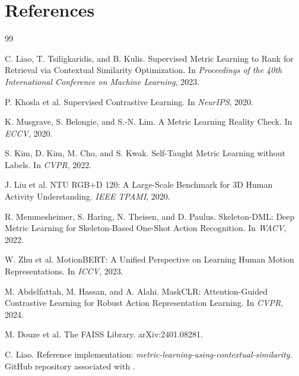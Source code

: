 \documentclass[11pt,oneside,openany]{book}
\theoremstyle{myplain}
\theoremstyle{definition}
\begin{document}
\chapter*{References}
\begin{thebibliography}{99}

C. Liao, T. Tsiligkaridis, and B. Kulis.
\newblock Supervised Metric Learning to Rank for Retrieval via Contextual Similarity Optimization.
\newblock In \emph{Proceedings of the 40th International Conference on Machine Learning}, 2023.

P. Khosla et al.
\newblock Supervised Contrastive Learning.
\newblock In \emph{NeurIPS}, 2020.

K. Musgrave, S. Belongie, and S.-N. Lim.
\newblock A Metric Learning Reality Check.
\newblock In \emph{ECCV}, 2020.

S. Kim, D. Kim, M. Cho, and S. Kwak.
\newblock Self-Taught Metric Learning without Labels.
\newblock In \emph{CVPR}, 2022.

J. Liu et al.
\newblock NTU RGB+D 120: A Large-Scale Benchmark for 3D Human Activity Understanding.
\newblock \emph{IEEE TPAMI}, 2020.

R. Memmesheimer, S. Haring, N. Theisen, and D. Paulus.
\newblock Skeleton-DML: Deep Metric Learning for Skeleton-Based One-Shot Action Recognition.
\newblock In \emph{WACV}, 2022.

W. Zhu et al.
\newblock MotionBERT: A Unified Perspective on Learning Human Motion Representations.
\newblock In \emph{ICCV}, 2023.

M. Abdelfattah, M. Hassan, and A. Alahi.
\newblock MaskCLR: Attention-Guided Contrastive Learning for Robust Action Representation Learning.
\newblock In \emph{CVPR}, 2024.

M. Douze et al.
\newblock The FAISS Library.
\newblock arXiv:2401.08281.

C. Liao.
\newblock Reference implementation: \emph{metric-learning-using-contextual-similarity}.
\newblock GitHub repository associated with \cite{liao2023}.

\end{thebibliography}
\end{document}
